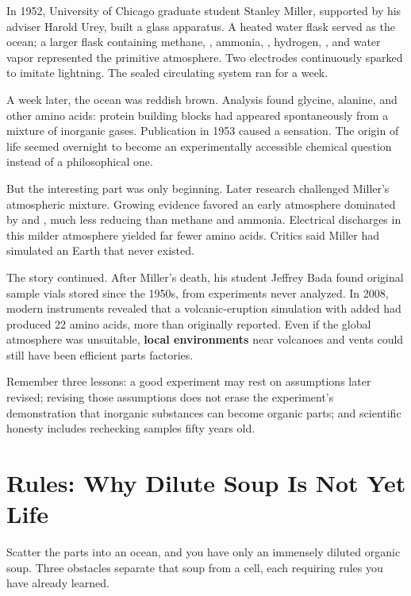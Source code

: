\begin{zhengju}
In 1952, University of Chicago graduate student Stanley Miller, supported by his adviser Harold Urey, built a glass apparatus. A heated water flask served as the ocean; a larger flask containing methane, , ammonia, , hydrogen, , and water vapor represented the primitive atmosphere. Two electrodes continuously sparked to imitate lightning. The sealed circulating system ran for a week.

A week later, the ocean was reddish brown. Analysis found glycine, alanine, and other amino acids: protein building blocks had appeared spontaneously from a mixture of inorganic gases. Publication in 1953 caused a sensation. The origin of life seemed overnight to become an experimentally accessible chemical question instead of a philosophical one.

But the interesting part was only beginning. Later research challenged Miller's atmospheric mixture. Growing evidence favored an early atmosphere dominated by  and , much less reducing than methane and ammonia. Electrical discharges in this milder atmosphere yielded far fewer amino acids. Critics said Miller had simulated an Earth that never existed.

The story continued. After Miller's death, his student Jeffrey Bada found original sample vials stored since the 1950s, from experiments never analyzed. In 2008, modern instruments revealed that a volcanic-eruption simulation with added  had produced 22 amino acids, more than originally reported. Even if the global atmosphere was unsuitable, \textbf{local environments} near volcanoes and vents could still have been efficient parts factories.

Remember three lessons: a good experiment may rest on assumptions later revised; revising those assumptions does not erase the experiment's demonstration that inorganic substances can become organic parts; and scientific honesty includes rechecking samples fifty years old.
\end{zhengju}

\section{Rules: Why Dilute Soup Is Not Yet Life}

Scatter the parts into an ocean, and you have only an immensely diluted organic soup. Three obstacles separate that soup from a cell, each requiring rules you have already learned.

